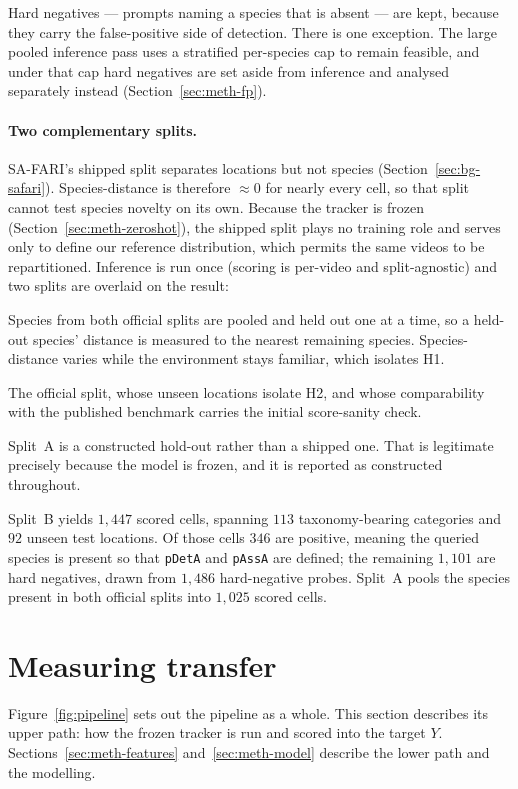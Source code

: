 Hard negatives --- prompts naming a species that is absent --- are kept, because they carry the false-positive
side of detection. There is one exception. The large pooled inference pass uses a stratified per-species cap to
remain feasible, and under that cap hard negatives are set aside from inference and analysed separately
instead (Section~\ref{sec:meth-fp}).

\paragraph{Two complementary splits.}
SA-FARI's shipped split separates locations but not species (Section~\ref{sec:bg-safari}). Species-distance is
therefore $\approx\!0$ for nearly every cell, so that split cannot test species novelty on its own. Because the
tracker is frozen (Section~\ref{sec:meth-zeroshot}), the shipped split plays no training role and serves only
to define our reference distribution, which permits the same videos to be repartitioned. Inference is run
once (scoring is per-video and split-agnostic) and two splits are overlaid on the result:
\begin{description}[leftmargin=1.6em,style=nextline]
  \item[Split~A --- species hold-out (primary).] Species from both official splits are pooled and held out one
    at a time, so a held-out species' distance is measured to the nearest remaining species. Species-distance
    varies while the environment stays familiar, which isolates H1.
  \item[Split~B --- location hold-out (secondary).] The official split, whose unseen locations isolate H2, and
    whose comparability with the published benchmark carries the initial score-sanity check.
\end{description}
Split~A is a constructed hold-out rather than a shipped one. That is legitimate precisely because the model is
frozen, and it is reported as constructed throughout.

Split~B yields $1{,}447$ scored cells, spanning $113$ taxonomy-bearing categories and $92$ unseen test
locations. Of those cells $346$ are positive, meaning the queried species is present so that \texttt{pDetA} and
\texttt{pAssA} are defined; the remaining $1{,}101$ are hard negatives, drawn from $1{,}486$ hard-negative
probes. Split~A pools the species present in both official splits into $1{,}025$ scored cells.

\section{Measuring transfer}
\label{sec:meth-measure}
Figure~\ref{fig:pipeline} sets out the pipeline as a whole. This section describes its upper path: how the
frozen tracker is run and scored into the target $Y$. Sections~\ref{sec:meth-features}
and~\ref{sec:meth-model} describe the lower path and the modelling.

